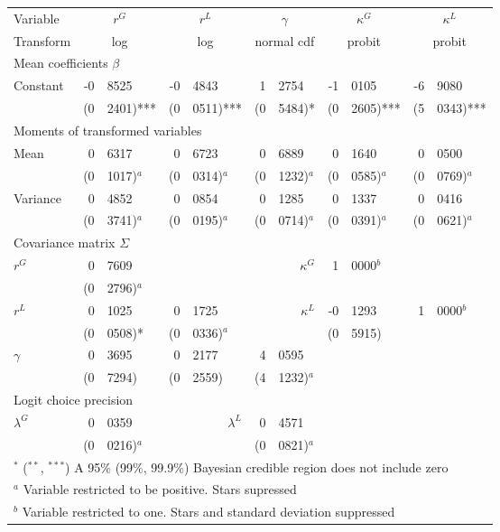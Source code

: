 \begin{tabular}{l r@{.}l r@{.}l r@{.}l r@{.}l r@{.}l}\\ \hline\hline
Variable&\multicolumn{2}{c}{$ r^{G} $}&\multicolumn{2}{c}{$ r^{L} $}&\multicolumn{2}{c}{$ \gamma $}&\multicolumn{2}{c}{$ \kappa^{G} $}&\multicolumn{2}{c}{$ \kappa^{L} $} \\ 
Transform&\multicolumn{2}{c}{ log }&\multicolumn{2}{c}{ log }&\multicolumn{2}{c}{ normal cdf }&\multicolumn{2}{c}{ probit }&\multicolumn{2}{c}{ probit } \\ \hline 
\multicolumn{11}{l}{{\sc Mean coefficients $\beta$}} \\  
Constant& -0 & 8525& -0 & 4843& 1 & 2754& -1 & 0105& -6 & 9080 \\ 
& (0 & 2401)***& (0 & 0511)***& (0 & 5484)*& (0 & 2605)***& (5 & 0343)*** \\ \hline 
\multicolumn{11}{l}{{\sc Moments of transformed variables}} \\  
Mean& 0 & 6317& 0 & 6723& 0 & 6889& 0 & 1640& 0 & 0500 \\ 
& (0 & 1017)$^a$& (0 & 0314)$^a$& (0 & 1232)$^a$& (0 & 0585)$^a$& (0 & 0769)$^a$ \\  
Variance& 0 & 4852& 0 & 0854& 0 & 1285& 0 & 1337& 0 & 0416 \\ 
& (0 & 3741)$^a$& (0 & 0195)$^a$& (0 & 0714)$^a$& (0 & 0391)$^a$& (0 & 0621)$^a$ \\ \hline 
\multicolumn{11}{l}{{\sc Covariance matrix} $\Sigma$} \\  
$r^{G}$& 0 & 7609& \multicolumn{2}{c}{ }&\multicolumn{2}{r}{$ \kappa^{G} $}&1&0000$^b$ \\  
& (0 & 2796)$^a$& \multicolumn{2}{c}{ } \\  
$r^{L}$& 0 & 1025& 0 & 1725&\multicolumn{2}{r}{$ \kappa^{L} $}& -0 & 1293&1&0000$^b$ \\  
& (0 & 0508)*& (0 & 0336)$^a$&\multicolumn{2}{c}{}& (0 & 5915) \\  
$\gamma$& 0 & 3695& 0 & 2177& 4 & 0595 \\  
& (0 & 7294)& (0 & 2559)& (4 & 1232)$^a$ \\  
 \hline 
\multicolumn{11}{l}{{\sc Logit choice precision}} \\  
$\lambda^{G}$& 0 & 0359&\multicolumn{2}{r}{$\lambda^{L}$}& 0 & 4571 \\ 
& (0 & 0216)$^a$&\multicolumn{2}{r}{}& (0 & 0821)$^a$ \\ 
 \hline\hline 
\multicolumn{11}{l}{\footnotesize{$^*$ ($^{**}$, $^{***}$) A 95\% (99\%, 99.9\%) Bayesian credible region does not include zero}}\\\multicolumn{11}{l}{\footnotesize{$^a$ Variable restricted to be positive. Stars supressed}}\\\multicolumn{11}{l}{\footnotesize{$^b$ Variable restricted to one. Stars and standard deviation suppressed}}\\\end{tabular} \\ 
